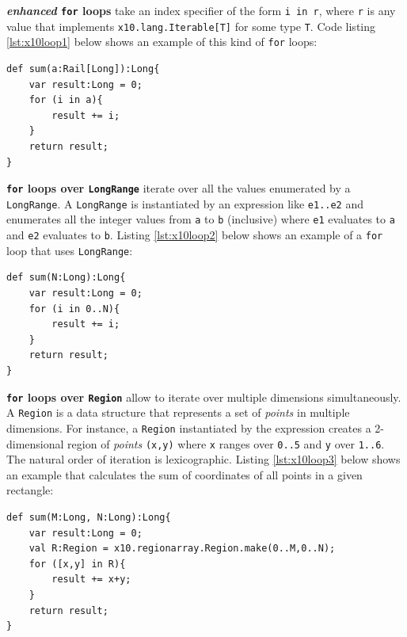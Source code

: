 \begin{description}

\item \textbf{\emph{enhanced} \texttt{for} loops} take an index 
specifier of the 
form \texttt{i in r}, where \texttt{r} is any
value that implements \texttt{x10.lang.Iterable[T]} for some type \texttt{T}.
Code listing \ref{lst:x10loop1} below shows 
an example of this kind of \texttt{for} loops:
\begin{lstlisting}[caption={Example of enhanced for loop},label={lst:x10loop1},language=x10,numbers=none]
def sum(a:Rail[Long]):Long{
	var result:Long = 0;
	for (i in a){
		result += i;
	}
	return result;
}
\end{lstlisting}

\item \textbf{\texttt{for} loops over \texttt{LongRange}} iterate over all
the values enumerated by a \texttt{\justify LongRange}. A \texttt{LongRange} is
instantiated by an expression like \texttt{e1..e2} and enumerates all the
integer values from \texttt{a} to \texttt{b} (inclusive) where \texttt{e1}
evaluates to \texttt{a} and \texttt{e2} evaluates to \texttt{b}. Listing
\ref{lst:x10loop2} below
shows an example of a \texttt{for} loop that uses \texttt{LongRange}:
\begin{lstlisting}[caption={Example of for loop over \texttt{LongRange}},label={lst:x10loop2},language=x10,numbers=none]
def sum(N:Long):Long{
	var result:Long = 0;
	for (i in 0..N){
		result += i;
	}
	return result;
}
\end{lstlisting}

\item \textbf{\texttt{for} loops over \texttt{Region}} allow to iterate over
multiple dimensions simultaneously. A \texttt{Region} is a data structure that
represents a set of \emph{points} in multiple dimensions. For instance, a
\texttt{Region} instantiated by the expression 
\texttt{}
creates a 2-dimensional region of \emph{points} \texttt{(x,y)} where \texttt{x}
ranges over \texttt{0..5} and \texttt{y} over \texttt{1..6}. The natural order
of iteration is lexicographic. Listing \ref{lst:x10loop3} below shows an example that calculates
the sum of coordinates of all points in a given rectangle:
\begin{lstlisting}[caption={Example of for loop over a 2-D \texttt{Region}},label={lst:x10loop3},language=x10,numbers=none]
def sum(M:Long, N:Long):Long{
	var result:Long = 0;
	val R:Region = x10.regionarray.Region.make(0..M,0..N);
	for ([x,y] in R){
		result += x+y;
	}
	return result;
}
\end{lstlisting}

 
\end{description}

